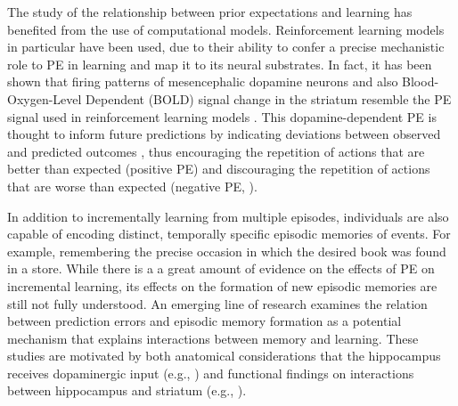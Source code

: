\documentclass[a4paper,12pt]{article}
\begin{document}
The study of the relationship between prior expectations and learning has benefited from the use of computational models. Reinforcement learning models in particular have been used, due to their ability to confer a precise mechanistic role to PE in learning and map it to its neural substrates. In fact, it has been shown that firing patterns of mesencephalic dopamine neurons and also Blood-Oxygen-Level Dependent (BOLD) signal change in the striatum resemble the PE signal used in reinforcement learning models \citep{Daw2011, McClure2003, Schultz1997}. This dopamine-dependent PE is thought to inform future predictions by indicating deviations between observed and predicted outcomes \citep{Daw2013, Niv2008, Rangel2008a, Rushworth2008}, thus encouraging the repetition of actions that are better than expected (positive PE) and discouraging the repetition of actions that are worse than expected (negative PE, \citealp{Schultz2016, Steinberg2013}). \par
In addition to incrementally learning from multiple episodes, individuals are also capable of encoding distinct, temporally specific episodic memories of events. For example, remembering the precise occasion in which the desired book was found in a store. 
While there is a a great amount of evidence on the effects of PE on incremental learning, its  effects on the formation of new episodic memories are still not fully understood. An emerging line of research examines the relation between prediction errors and episodic memory formation as a potential mechanism that explains interactions between memory and learning. These studies are motivated by both anatomical considerations that the hippocampus receives dopaminergic input (e.g., \citealp{Lisman2005}) and functional findings on interactions between hippocampus and striatum (e.g., \citealp{Poldrack2001}). \par
\end{document}
